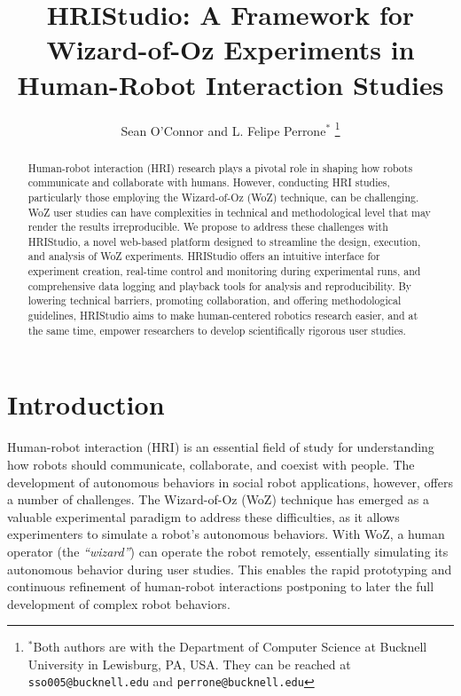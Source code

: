 \documentclass[letterpaper, 10 pt, conference]{ieeeconf}
\title{\LARGE \bf HRIStudio: A Framework for Wizard-of-Oz Experiments in Human-Robot Interaction Studies}
\author{Sean O'Connor and L. Felipe Perrone$^{*}$
    \thanks{$^{*}$Both authors are with the Department of Computer Science at
        Bucknell University in Lewisburg, PA, USA. They can be reached at {\tt\small sso005@bucknell.edu} and {\tt\small perrone@bucknell.edu}}%
}
\begin{document}
\maketitle
\thispagestyle{empty}
\pagestyle{empty}


\begin{abstract}

Human-robot interaction (HRI) research plays a pivotal role in shaping how robots communicate and collaborate with humans. However, conducting HRI studies, particularly those employing the Wizard-of-Oz (WoZ) technique, can be challenging. WoZ user studies can have complexities in technical and methodological level that may render the results irreproducible. We propose to address these challenges with HRIStudio, a novel web-based platform designed to streamline the design, execution, and analysis of WoZ experiments. HRIStudio offers an intuitive interface for experiment creation, real-time control and monitoring during experimental runs, and comprehensive data logging and playback tools for analysis and reproducibility. By lowering technical barriers, promoting collaboration, and offering methodological guidelines, HRIStudio aims to make human-centered robotics research easier, and at the same time, empower researchers to develop scientifically rigorous user studies.

\end{abstract}




\section{Introduction}

Human-robot interaction (HRI) is an essential field of study for understanding how robots should communicate, collaborate, and coexist with people. The development of autonomous behaviors in social robot applications, however, offers a number of challenges. The Wizard-of-Oz (WoZ) technique has emerged as a valuable experimental paradigm to address these difficulties, as it allows experimenters to simulate a robot's autonomous behaviors. With WoZ, a human operator (the \emph{``wizard''}) can operate the robot remotely, essentially simulating its autonomous behavior during user studies. This enables the rapid prototyping and continuous refinement of human-robot interactions postponing to later the full development of complex robot behaviors.
\end{document}
